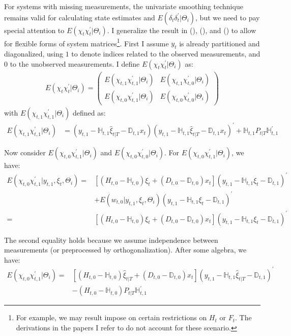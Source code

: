 \documentclass[10pt, titlepage]{article}
\numberwithin{equation}{section}
\begin{document}
For systems with missing measurements, the univariate smoothing technique remains valid for calculating state estimates and $E(\delta_t\delta_t^{'}|\Theta_i)$, but we need to pay special attention to $E(\chi_t\chi_t^{'}|\Theta_i)$. I generalize the result in (\cite{shumway_stoffer_1982}), (\cite{shumway_2000}), and (\cite{shumway2017time}) to allow for flexible forms of system matrices\footnote{For example, we may result impose on certain restrictions on $H_t$ or $F_t$. The derivations in the papers I refer to do not account for these scenario.}. First I assume $y_t$ is already partitioned and diagonalized, using $1$ to denote indices related to the observed measurements, and $0$ to the unobserved measurements. I define $E(\chi_{t}\chi_{t}^{'}|\Theta_i)$ as:
\begin{align*}
    E(\chi_{t}\chi_{t}^{'}|\Theta_i) = \begin{pmatrix}
        E(\chi_{t,1}\chi_{t,1}^{'}|\Theta_i) & E(\chi_{t,1}\chi_{t,0}^{'}|\Theta_i) \\
        E(\chi_{t,0}\chi_{t,1}^{'}|\Theta_i) & E(\chi_{t,0}\chi_{t,0}^{'}|\Theta_i)
    \end{pmatrix}
\end{align*}
with $E(\chi_{t,1}\chi_{t,1}^{'}|\Theta_i)$ defined as:
\begin{align}
    E(\chi_{t,1}\chi_{t,1}^{'}|\Theta_i) &= (y_{t,1} - \mathbb{H}_{t,1}\hat{\xi}_{t|T} - \mathbb{D}_{t,1}x_t)(y_{t,1} - \mathbb{H}_{t,1}\hat{\xi}_{t|T} 
        - \mathbb{D}_{t,1}x_t)^{'} + \mathbb{H}_{t,1}P_{t|T}\mathbb{H}_{t,1}^{'} \label{eq:chi2_start} 
\end{align}

Now consider $E(\chi_{t,0}\chi_{t,1}^{'}|\Theta_i)$ and $E(\chi_{t,0}\chi_{t,0}^{'}|\Theta_i)$. For $E(\chi_{t,0}\chi_{t,1}^{'}|\Theta_i)$, we have:
\begin{align*}
    E(\chi_{t,0}\chi_{t,1}^{'}|y_{t,1},\xi_t,\Theta_i) =& [(H_{t,0}-\mathbb{H}_{t,0})\xi_t+(D_{t,0}-\mathbb{D}_{t,0})x_t]
        (y_{t,1}-\mathbb{H}_{t,1}\xi_t-\mathbb{D}_{t,1})^{'} \\
    &+E(w_{t,0}|y_{t,1},\xi_t,\Theta_i)(y_{t,1}-\mathbb{H}_{t,1}\xi_t-\mathbb{D}_{t,1})^{'} \\
    =& [(H_{t,0}-\mathbb{H}_{t,0})\xi_t+(D_{t,0}-\mathbb{D}_{t,0})x_t]
        (y_{t,1}-\mathbb{H}_{t,1}\xi_t-\mathbb{D}_{t,1})^{'}
\end{align*}

The second equality holds because we assume independence between measurements (or preprocessed by orthogonalization). After some algebra, we have:
\begin{align}
    E(\chi_{t,0}\chi_{t,1}^{'}|\Theta_i) =& [(H_{t,0}-\mathbb{H}_{t,0})\hat{\xi}_{t|T}+(D_{t,0}-\mathbb{D}_{t,0})x_t]
        (y_{t,1}-\mathbb{H}_{t,1}\hat{\xi}_{t|T}-\mathbb{D}_{t,1})^{'} \\
        &- (H_{t,0}-\mathbb{H}_{t,0})P_{t|T}\mathbb{H}_{t,1}^{'} \nonumber
\end{align}
\end{document}
